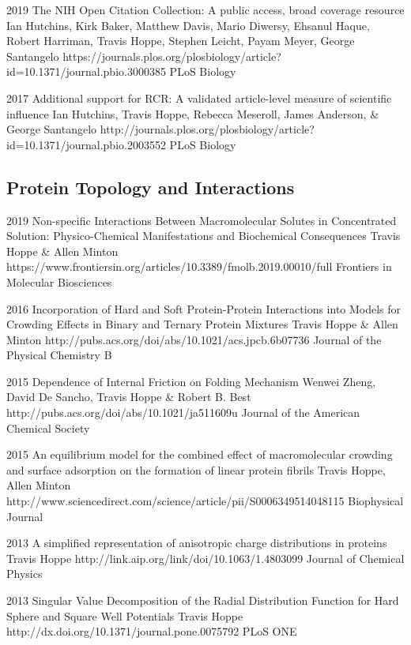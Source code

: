 \documentclass[]{scrartcl}
\begin{document}
\begin{cleanCV}
\Paper
{2019}
{The NIH Open Citation Collection: A public access, broad coverage resource}
{Ian Hutchins, Kirk Baker, Matthew Davis, Mario Diwersy, Ehsanul Haque, Robert Harriman, Travis Hoppe, Stephen Leicht, Payam Meyer, George Santangelo}
{https://journals.plos.org/plosbiology/article?id=10.1371/journal.pbio.3000385}
{PLoS Biology}


\Paper
{2017}
{Additional support for RCR: A validated article-level measure of scientific influence}
{Ian Hutchins, Travis Hoppe, Rebecca Meseroll, James Anderson, \& George Santangelo}
{http://journals.plos.org/plosbiology/article?id=10.1371/journal.pbio.2003552}
{PLoS Biology}


\subsection{Protein Topology and Interactions}

\Paper
{2019}
{Non-specific Interactions Between Macromolecular Solutes in Concentrated Solution: Physico-Chemical Manifestations and Biochemical Consequences}
{Travis Hoppe \& Allen Minton}
{https://www.frontiersin.org/articles/10.3389/fmolb.2019.00010/full}
{Frontiers in Molecular Biosciences}


\Paper
{2016}
{Incorporation of Hard and Soft Protein-Protein Interactions into Models for Crowding Effects in Binary and Ternary Protein Mixtures}
{Travis Hoppe \& Allen Minton}
{http://pubs.acs.org/doi/abs/10.1021/acs.jpcb.6b07736}
{Journal of the Physical Chemistry B}

\Paper
{2015}
{Dependence of Internal Friction on Folding Mechanism}
{Wenwei Zheng, David De Sancho, Travis Hoppe \& Robert B. Best}
{http://pubs.acs.org/doi/abs/10.1021/ja511609u}
{Journal of the American Chemical Society}

\Paper
{2015}
{An equilibrium model for the combined effect of macromolecular crowding and surface adsorption on the formation of linear protein fibrils}
{Travis Hoppe, Allen Minton}
{http://www.sciencedirect.com/science/article/pii/S0006349514048115}
{Biophysical Journal}

\Paper
{2013}
{A simplified representation of anisotropic charge distributions in proteins}
{Travis Hoppe}
{http://link.aip.org/link/doi/10.1063/1.4803099}
{Journal of Chemical Physics}

\Paper
{2013}
{Singular Value Decomposition of the Radial Distribution Function 
for Hard Sphere and Square Well Potentials}
{Travis Hoppe}
{http://dx.doi.org/10.1371/journal.pone.0075792}
{PLoS ONE}


\end{cleanCV}
\end{document}
